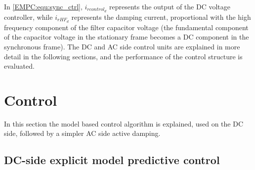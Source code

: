     In \ref{EMPC:equ:sync_ctrl}, $i_{rcontrol_d}$ represents the output of the DC voltage controller, while $i_{rHF_d}$ represents the damping current, proportional with the high frequency component of the filter capacitor voltage (the fundamental component of the capacitor voltage in the stationary frame becomes a DC component in the synchronous frame). The DC and AC side control units are explained in more detail in the following sections, and the performance of the control structure is evaluated.
		
\section{Control}\label{EMPC:sec:Control}

    In this section the model based control algorithm is explained, used on the DC side, followed by a simpler AC side active damping.

\subsection{DC-side explicit model predictive control} \label{EMPC:sec:DCside}

